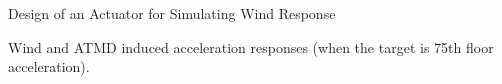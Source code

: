 \documentclass[usepdftitle=false]{beamer}
\begin{document}
\begin{frame}{Design of an Actuator for Simulating Wind Response}
\begin{figure}[!ht]
\centering
\setcounter{subfigure}{0}


\label{fig:6-11}
\end{figure}
Wind and ATMD induced acceleration responses (when the target is 75th floor acceleration).
\end{frame}
\end{document}
